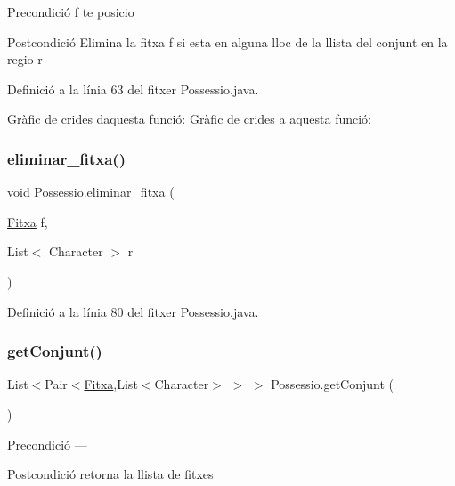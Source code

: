 \begin{DoxyPrecond}{Precondició}
f te posicio 
\end{DoxyPrecond}
\begin{DoxyPostcond}{Postcondició}
Elimina la fitxa f si esta en alguna lloc de la llista del conjunt en la regio r 
\end{DoxyPostcond}


Definició a la línia 63 del fitxer Possessio.\+java.

Gràfic de crides d\textquotesingle{}aquesta funció\+:
Gràfic de crides a aquesta funció\+:
\mbox{\label{class_possessio_a2908495ca9acf15fb6c789e753a0eec8}} 
\subsubsection{\texorpdfstring{eliminar\+\_\+fitxa()}{eliminar\_fitxa()}\hspace{0.1cm}{\footnotesize\ttfamily [2/2]}}
{\footnotesize\ttfamily void Possessio.\+eliminar\+\_\+fitxa (\begin{DoxyParamCaption}\item[{\mbox{\hyperlink{class_fitxa}{Fitxa}}}]{f,  }\item[{List$<$ Character $>$}]{r }\end{DoxyParamCaption})}



Definició a la línia 80 del fitxer Possessio.\+java.

\mbox{\label{class_possessio_a2e484840944b6f2c5a1fbe7219d39b9c}} 
\subsubsection{\texorpdfstring{get\+Conjunt()}{getConjunt()}}
{\footnotesize\ttfamily List$<$Pair$<$\mbox{\hyperlink{class_fitxa}{Fitxa}},List$<$Character$>$ $>$ $>$ Possessio.\+get\+Conjunt (\begin{DoxyParamCaption}{ }\end{DoxyParamCaption})}

\begin{DoxyPrecond}{Precondició}
--- 
\end{DoxyPrecond}
\begin{DoxyPostcond}{Postcondició}
retorna la llista de fitxes 
\end{DoxyPostcond}


